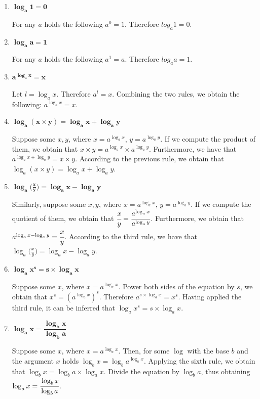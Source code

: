 \documentclass[10pt,a4paper]{article}
\begin{document}
\begin{enumerate}
    \item{$\boldsymbol{\log_a 1 = 0}$}  %

    For any $a$ holds the following $a^0 = 1$. Therefore $log_a 1 = 0$.
    
    \item{$\boldsymbol{\log_a a = 1}$}  %

    For any $a$ holds the following $a^1 = a$. Therefore $log_a a = 1$.

    \item{$\boldsymbol{a^{\log_a x} = x}$}  %

    Let $l = \log_a x$. Therefore $a^{l} = x$. Combining the two rules, we obtain the following:
    $a^{\log_a x} = x$.

    \item{$\boldsymbol{\log_a (x \times y) = \log_a x + \log_a y}$}  %
    
    Suppose some $x,y$, where $x = a^{\log_a x}$, $y = a^{\log_a y}$. If we compute the product
    of them, we obtain that $x \times y = a^{\log_a x} \times a^{\log_a y}$. Furthermore, we 
    have that $a^{\log_a x + \log_a y} = x \times y$. According to the previous rule, we 
    obtain that $\log_a (x \times y) = \log_a x + \log_a y$.

    \item{$\boldsymbol{\log_a \Big( \frac{x}{y} \Big) = \log_a x - \log_a y}$}  %
    
    Similarly, suppose some $x,y$, where $x = a^{\log_a x}$, $y = a^{\log_a y}$. If we compute 
    the quotient of them, we obtain that $\cfrac{x}{y} = \cfrac{a^{\log_a x}}{a^{\log_a y}}$. 
    Furthermore,  we obtain that $a^{\log_a x - \log_a y} = \cfrac{x}{y}$. According to the third 
    rule, we have that $\log_a \big(\frac{x}{y}\big) = \log_a x - \log_a y$.

    \item{$\boldsymbol{\log_a x^{s} = s \times \log_a x}$}  %

    Suppose some $x$, where $x = a^{\log_a x}$. Power both sides of the equation by $s$, we 
    obtain that $x^{s} = (a^{\log_a x})^{s}$. Therefore $a^{s \times \log_a x} = x^{s}$.
    Having applied the third rule, it can be inferred that $\log_a x^{s} = s \times \log_a x$.

    \item{$\boldsymbol{\log_a x = \dfrac{\log_b x}{\log_b a}}$}  %

    Suppose some $x$, where $x = a^{\log_a x}$. Then, for some $\log$ with the base $b$ and the 
    argument $x$ holds $\log_b x = \log_b a^{\log_a x}$. Applying the sixth rule, we obtain that
    $\log_b x = \log_b a \times \log_a x$. Divide the equation by $\log_b a$, thus obtaining
    $\log_a x = \cfrac{\log_b x}{\log_b a}$.

\end{enumerate}
    
\end{document}
